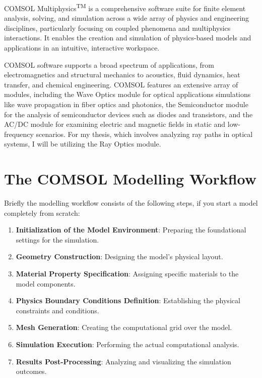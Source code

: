 COMSOL Multiphysics\textsuperscript{TM} is a comprehensive software suite for finite element analysis, solving, and simulation across a wide array of physics and engineering disciplines, particularly focusing on coupled phenomena and multiphysics interactions. It enables the creation and simulation of physics-based models and applications in an intuitive, interactive workspace.

COMSOL software supports a broad spectrum of applications, from electromagnetics and structural mechanics to acoustics, fluid dynamics, heat transfer, and chemical engineering. COMSOL features an extensive array of modules, including the Wave Optics module for optical applications simulations like wave propagation in fiber optics and photonics, the Semiconductor module for the analysis of semiconductor devices such as diodes and transistors, and the AC/DC module for examining electric and magnetic fields in static and low-frequency scenarios. For my thesis, which involves analyzing ray paths in optical systems, I will be utilizing the Ray Optics module.

\section{The COMSOL Modelling Workflow}
Briefly the modelling workflow consists of the following steps, if you start a model completely from scratch:

\begin{enumerate}
    \item \textbf{Initialization of the Model Environment}: Preparing the foundational settings for the simulation.
    \item \textbf{Geometry Construction}: Designing the model's physical layout.
    \item \textbf{Material Property Specification}: Assigning specific materials to the model components.
    \item \textbf{Physics Boundary Conditions Definition}: Establishing the physical constraints and conditions.
    \item \textbf{Mesh Generation}: Creating the computational grid over the model.
    \item \textbf{Simulation Execution}: Performing the actual computational analysis.
    \item \textbf{Results Post-Processing}: Analyzing and visualizing the simulation outcomes.
\end{enumerate}

